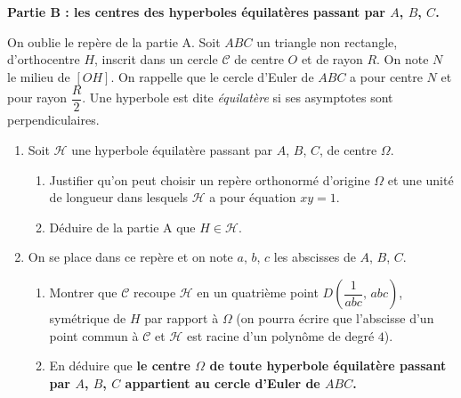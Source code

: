 \textbf{Partie B : les centres des hyperboles équilatères passant par $A$, $B$, $C$.}

On oublie le repère de la partie A. Soit $ABC$ un triangle non rectangle, d'orthocentre $H$, inscrit dans un cercle $\mathcal C$ de centre $O$ et de rayon $R$. On note $N$ le milieu de $[OH]$.
On rappelle que le cercle d'Euler de $ABC$ a pour centre $N$ et pour rayon $\dfrac R2$.
Une hyperbole est dite \emph{équilatère} si ses asymptotes sont perpendiculaires.

\begin{enumerate}
  \item Soit $\mathcal H$ une hyperbole équilatère passant par $A$, $B$, $C$, de centre $\Omega$.
  \begin{enumerate}
    \item Justifier qu'on peut choisir un repère orthonormé d'origine $\Omega$ et une unité de longueur dans lesquels $\mathcal H$ a pour équation $xy=1$.
    \item Déduire de la partie A que $H\in\mathcal H$.
  \end{enumerate}
  \item On se place dans ce repère et on note $a$, $b$, $c$ les abscisses de $A$, $B$, $C$.
  \begin{enumerate}
    \item Montrer que $\mathcal C$ recoupe $\mathcal H$ en un quatrième point $D\left(\dfrac{1}{abc},\,abc\right)$, symétrique de $H$ par rapport à $\Omega$ (on pourra écrire que l'abscisse d'un point commun à $\mathcal C$ et $\mathcal H$ est racine d'un polynôme de degré $4$).
    \item En déduire que \textbf{le centre $\Omega$ de toute hyperbole équilatère passant par $A$, $B$, $C$ appartient au cercle d'Euler de $ABC$.}
  \end{enumerate}
\end{enumerate}


